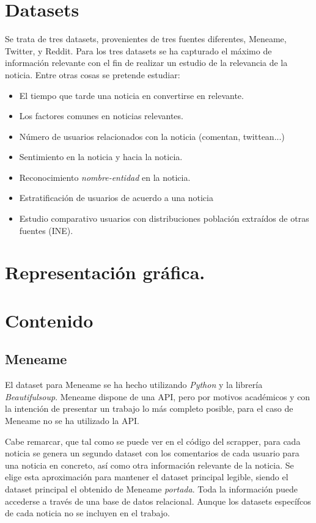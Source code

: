 \documentclass[a4paper,12pt]{article}
\begin{document}
\section[item_dataset]{Datasets}

Se trata de tres datasets, provenientes de tres fuentes diferentes, Meneame, Twitter, y Reddit. Para los tres datasets se ha capturado el m\'aximo de informaci\'on relevante con el fin de realizar un estudio de la relevancia de la noticia. Entre otras cosas se pretende estudiar:

\begin{itemize}

\item El tiempo que tarde una noticia en convertirse en relevante.
\item Los factores comunes en noticias relevantes.
\item N\'umero de usuarios relacionados con la noticia (comentan, twittean...)
\item Sentimiento en la noticia y hacia la noticia.
\item Reconocimiento {\itshape nombre-entidad} en la noticia.
\item Estratificaci\'on de usuarios de acuerdo a una noticia
\item Estudio comparativo usuarios con distribuciones poblaci\'on extra\'idos de otras fuentes (INE).  
\end{itemize}


\section[item_grafico]{Representaci\'on  gr\'afica. }

\section[item_contenido]{Contenido}

\subsection{Meneame}

El dataset para Meneame se ha hecho utilizando {\itshape Python} y la librer\'ia {\itshape Beautifulsoup}. Meneame dispone de una API, pero por motivos acad\'emicos y con la intenci\'on de presentar un trabajo lo m\'as completo posible, para el caso de Meneame no se ha utilizado la API.

Cabe remarcar, que tal como se puede ver en el c\'odigo del scrapper, para cada noticia se genera un segundo dataset con los comentarios de cada usuario para una noticia en concreto, as\'i como otra informaci\'on relevante de la noticia. Se elige esta aproximaci\'on para mantener el dataset principal legible, siendo el dataset principal el obtenido de Meneame {\itshape portada}. Toda la informaci\'on puede accederse a trav\'es de una base de datos relacional. Aunque los datasets espec\'ifcos de cada noticia no se incluyen en el trabajo.
\end{document}
